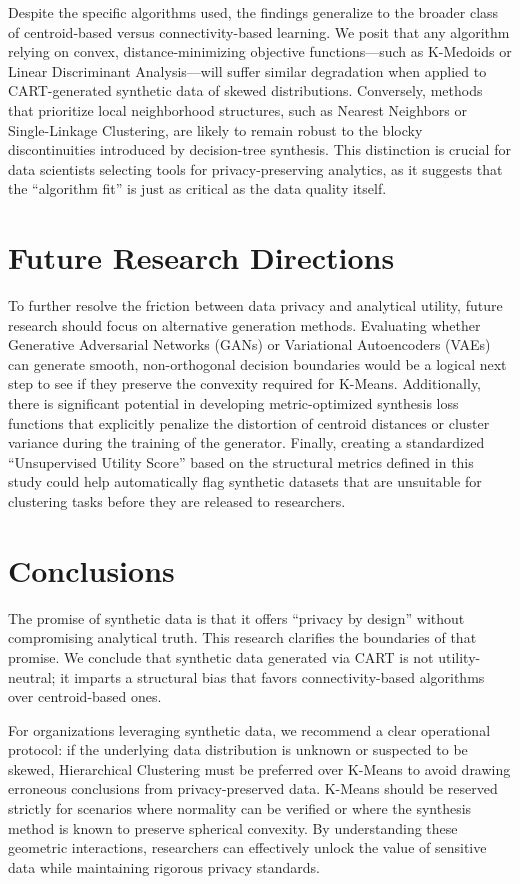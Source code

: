 Despite the specific algorithms used, the findings generalize to the broader class of centroid-based versus connectivity-based learning. We posit that any algorithm relying on convex, distance-minimizing objective functions---such as K-Medoids or Linear Discriminant Analysis---will suffer similar degradation when applied to CART-generated synthetic data of skewed distributions. Conversely, methods that prioritize local neighborhood structures, such as Nearest Neighbors or Single-Linkage Clustering, are likely to remain robust to the blocky discontinuities introduced by decision-tree synthesis. This distinction is crucial for data scientists selecting tools for privacy-preserving analytics, as it suggests that the ``algorithm fit'' is just as critical as the data quality itself.

\section{Future Research Directions}
\label{sec:future-research}

To further resolve the friction between data privacy and analytical utility, future research should focus on alternative generation methods. Evaluating whether Generative Adversarial Networks (GANs) or Variational Autoencoders (VAEs) can generate smooth, non-orthogonal decision boundaries would be a logical next step to see if they preserve the convexity required for K-Means. Additionally, there is significant potential in developing metric-optimized synthesis loss functions that explicitly penalize the distortion of centroid distances or cluster variance during the training of the generator. Finally, creating a standardized ``Unsupervised Utility Score'' based on the structural metrics defined in this study could help automatically flag synthetic datasets that are unsuitable for clustering tasks before they are released to researchers.

\section{Conclusions}
\label{sec:final-conclusions}

The promise of synthetic data is that it offers ``privacy by design'' without compromising analytical truth. This research clarifies the boundaries of that promise. We conclude that synthetic data generated via CART is not utility-neutral; it imparts a structural bias that favors connectivity-based algorithms over centroid-based ones.

For organizations leveraging synthetic data, we recommend a clear operational protocol: if the underlying data distribution is unknown or suspected to be skewed, Hierarchical Clustering must be preferred over K-Means to avoid drawing erroneous conclusions from privacy-preserved data. K-Means should be reserved strictly for scenarios where normality can be verified or where the synthesis method is known to preserve spherical convexity. By understanding these geometric interactions, researchers can effectively unlock the value of sensitive data while maintaining rigorous privacy standards.
